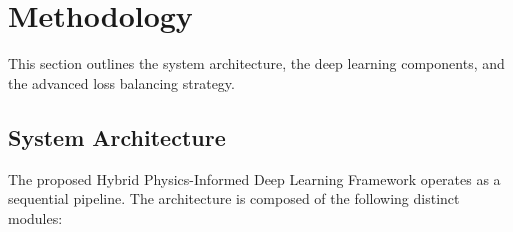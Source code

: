 \chapter{Methodology}
\label{ch:methodology}

This section outlines the system architecture, the deep learning components, and the advanced loss balancing strategy.

\section{System Architecture}
\label{sec:system_architecture}

The proposed Hybrid Physics-Informed Deep Learning Framework operates as a sequential pipeline. The architecture is composed of the following distinct modules:

